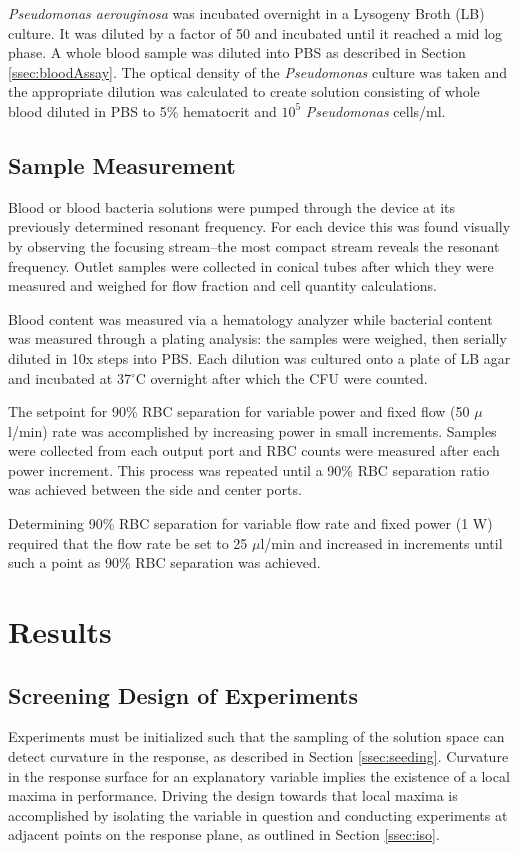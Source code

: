 \textit{Pseudomonas aerouginosa}  was incubated overnight in a Lysogeny Broth (LB) culture. It was diluted by a factor of 50 and incubated until it reached a mid log phase. A whole blood sample was diluted into PBS as described in Section \ref{ssec:bloodAssay}. The optical density of the \textit{Pseudomonas} culture was taken and the appropriate dilution was calculated to create solution consisting of whole blood diluted in PBS to 5\% hematocrit and $10^5$ \textit{Pseudomonas} cells/ml. 

\subsection{Sample Measurement}
\label{sec:sampleMeasurement}

Blood or blood bacteria solutions were pumped through the device at its previously determined resonant frequency.  For each device this was found visually by observing the focusing stream--the most compact stream reveals the resonant frequency.  Outlet samples were collected in conical tubes after which they were measured and weighed for flow fraction and cell quantity calculations. 

Blood content was measured via a hematology analyzer while bacterial content was measured through a plating analysis: the samples were weighed, then serially diluted in 10x steps into PBS. Each dilution was cultured onto a plate of LB agar and incubated at 37$^{\circ}$C overnight after which the CFU were counted.   

The setpoint for 90\% RBC separation for variable power and fixed flow (50 $\mu$l/min) rate was accomplished by increasing power in small increments. Samples were collected from each output port and RBC counts were measured after each power increment. This process was repeated until a 90\% RBC separation ratio was achieved between the side and center ports.

Determining 90\% RBC separation for variable flow rate and fixed power (1 W) required that the flow rate be set to 25 $\mu$l/min and increased in increments until such a point as 90\% RBC separation was achieved.  

\section{Results}
\label{sec:results}
\subsection{Screening Design of Experiments}
\label{ssec:doe}
Experiments must be initialized such that the sampling of the solution space can detect curvature in the response, as described in Section \ref{ssec:seeding}. Curvature in the response surface for an explanatory variable implies the existence of a local maxima in performance. Driving the design towards that local maxima is accomplished by isolating the variable in question and conducting experiments at adjacent points on the response plane, as outlined in Section \ref{ssec:iso}. 

